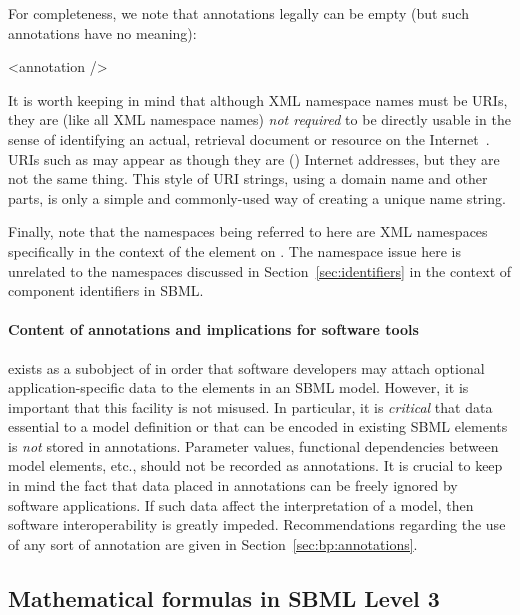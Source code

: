 For completeness, we note that annotations legally can be
empty (but such annotations have no meaning):

\begin{example}
<annotation />
\end{example}

It is worth keeping in mind that although XML namespace names must
be URIs, they are (like all XML namespace names) \emph{not
  required} to be directly usable in the sense of identifying an
actual, retrieval document or resource on the
Internet~\citep{bray:1999}.  URIs such as
 may appear as though they are (\eg)
Internet addresses, but they are not the same thing.  This style
of URI strings, using a domain name and other parts, is only a
simple and commonly-used way of creating a unique name string.

Finally, note that the namespaces being referred to here are XML
namespaces specifically in the context of the 
element on \SBase.  The namespace issue here is unrelated to the
namespaces discussed in Section~\ref{sec:identifiers} in the
context of component identifiers in SBML.


\paragraph{Content of annotations and implications for software tools}

\Annotation exists as a subobject of \SBase in
order that software developers may attach optional
application-specific data to the elements in an SBML model.
However, it is important that this facility is not misused.  In
particular, it is \emph{critical} that data essential to a model
definition or that can be encoded in existing SBML elements is
\emph{not} stored in annotations.  Parameter values,
functional dependencies between model elements, etc., should not
be recorded as annotations.  It is crucial to keep in mind the
fact that data placed in annotations can be freely ignored by
software applications.  If such data affect the interpretation of
a model, then software interoperability is greatly impeded.  
Recommendations regarding the use of any sort of annotation are
given in Section~\ref{sec:bp:annotations}.  


\subsection{Mathematical formulas in SBML Level 3}
\label{sec:formulas}

